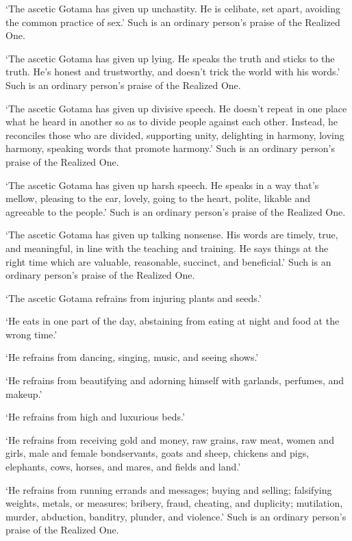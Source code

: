 \documentclass[12pt,openany]{book}%
\begin{document}
‘The ascetic Gotama has given up unchastity. He is celibate, set apart, avoiding the common practice of sex.’ Such is an ordinary person’s praise of the Realized One. 

‘The ascetic Gotama has given up lying. He speaks the truth and sticks to the truth. He’s honest and trustworthy, and doesn’t trick the world with his words.’ Such is an ordinary person’s praise of the Realized One. 

‘The ascetic Gotama has given up divisive speech. He doesn’t repeat in one place what he heard in another so as to divide people against each other. Instead, he reconciles those who are divided, supporting unity, delighting in harmony, loving harmony, speaking words that promote harmony.’ Such is an ordinary person’s praise of the Realized One. 

‘The ascetic Gotama has given up harsh speech. He speaks in a way that’s mellow, pleasing to the ear, lovely, going to the heart, polite, likable and agreeable to the people.’ Such is an ordinary person’s praise of the Realized One. 

‘The ascetic Gotama has given up talking nonsense. His words are timely, true, and meaningful, in line with the teaching and training. He says things at the right time which are valuable, reasonable, succinct, and beneficial.’ Such is an ordinary person’s praise of the Realized One. 

‘The ascetic Gotama refrains from injuring plants and seeds.’ 

‘He eats in one part of the day, abstaining from eating at night and food at the wrong time.’ 

‘He refrains from dancing, singing, music, and seeing shows.’ 

‘He refrains from beautifying and adorning himself with garlands, perfumes, and makeup.’ 

‘He refrains from high and luxurious beds.’ 

‘He refrains from receiving gold and money, raw grains, raw meat, women and girls, male and female bondservants, goats and sheep, chickens and pigs, elephants, cows, horses, and mares, and fields and land.’ 

‘He refrains from running errands and messages; buying and selling; falsifying weights, metals, or measures; bribery, fraud, cheating, and duplicity; mutilation, murder, abduction, banditry, plunder, and violence.’ Such is an ordinary person’s praise of the Realized One. 
\end{document}
